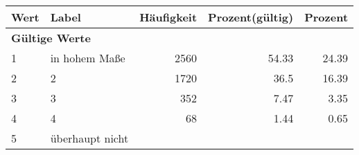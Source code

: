      \begin{longtable}{lXrrr}
     \toprule
     \textbf{Wert} & \textbf{Label} & \textbf{Häufigkeit} & \textbf{Prozent(gültig)} & \textbf{Prozent} \\
     \endhead
     \midrule
     \multicolumn{5}{l}{\textbf{Gültige Werte}}\\

     1 &
     \multicolumn{1}{X}{ in hohem Maße   } &


       \num{2560} &
       \num[round-mode=places,round-precision=2]{54,33} &
         \num[round-mode=places,round-precision=2]{24,39} \\

     2 &
     \multicolumn{1}{X}{ 2   } &


       \num{1720} &
       \num[round-mode=places,round-precision=2]{36,5} &
         \num[round-mode=places,round-precision=2]{16,39} \\

     3 &
     \multicolumn{1}{X}{ 3   } &


       \num{352} &
       \num[round-mode=places,round-precision=2]{7,47} &
         \num[round-mode=places,round-precision=2]{3,35} \\

     4 &
     \multicolumn{1}{X}{ 4   } &


       \num{68} &
       \num[round-mode=places,round-precision=2]{1,44} &
         \num[round-mode=places,round-precision=2]{0,65} \\

     5 &
     \multicolumn{1}{X}{ überhaupt nicht   } &



\end{longtable}
